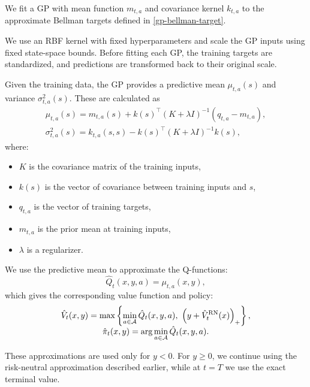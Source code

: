 We fit a GP with mean function $m_{t,a}$ and covariance kernel $k_{t,a}$ to the approximate Bellman targets defined in \eqref{gp-bellman-target}.

We use an RBF kernel with fixed hyperparameters and scale the GP inputs using fixed state-space bounds. Before fitting each GP, the training targets are standardized, and predictions are transformed back to their original scale.

Given the training data, the GP provides a predictive mean $\mu_{t,a}(s)$ and variance $\sigma_{t,a}^2(s)$. These are calculated as
\begin{equation}
	\begin{array}{c}
		\mu_{t, a}(s) = m_{t, a}(s) + k(s)^{\top} (K + \lambda I)^{-1} (q_{t, a} - m_{t, a}), \\
		\sigma_{t, a}^{2} (s) = k_{t, a}(s, s) - k(s)^{\top} (K + \lambda I)^{-1} k(s),
	\end{array}
	\label{gp-inference}
\end{equation}
where:
\begin{itemize}
	\item $K$ is the covariance matrix of the training inputs,
	\item $k(s)$ is the vector of covariance between training inputs and $s$,
	\item $q_{t, a}$ is the vector of training targets,
	\item $m_{t, a}$ is the prior mean at training inputs,
	\item $\lambda$ is a regularizer.
\end{itemize}

We use the predictive mean to approximate the Q-functions:
\begin{equation}
	\hat{Q}_t(x, y, a) = \mu_{t, a}(x, y),
	\label{gp-predictive-mean}
\end{equation}
which gives the corresponding value function and policy:
\begin{equation}
	\begin{array}{c}
		\displaystyle \hat{V}_t(x, y) = \max \left\{ \min_{a \in \mathcal{A}} \hat{Q}_t (x, y, a),\ \left( y + \hat{V}_t^{\text{RN}}(x) \right)_+ \right\},\\
		\displaystyle \hat{\pi}_t(x, y) = \arg\min_{a \in \mathcal{A}} \hat{Q}_t(x, y, a).
	\end{array}
	\label{gp-value-policy}
\end{equation}

These approximations are used only for $y<0$. For $y\geq0$, we continue using the risk-neutral approximation described earlier, while at $t=T$ we use the exact terminal value.

